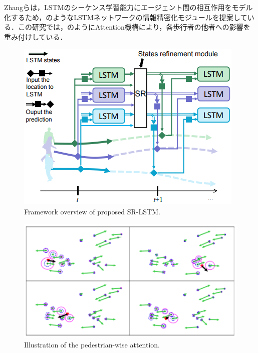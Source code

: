 
Zhangら\cite{sr-lstm}は，LSTMのシーケンス学習能力にエージェント間の相互作用をモデル化するため，のようなLSTMネットワークの情報精密化モジュールを提案している．この研究では，のようにAttention機構により，各歩行者の他者への影響を重み付けしている．


\begin{figure}[hbtp]
     \centering
    \includegraphics[keepaspectratio, scale=0.63]
         {images/sr-lstm-str.png}
    \caption{Framework overview of proposed SR-LSTM.\protect\footnotemark[2]}
    \label{Fig:sr-lstm-str}
\end{figure}


\begin{figure}[hbtp]
     \centering
    \includegraphics[keepaspectratio, scale=0.63]
         {images/sr-lstm.png}
    \caption{Illustration of the pedestrian-wise attention.\protect\footnotemark[2]}
    \label{Fig:sr-lstm}
\end{figure}


